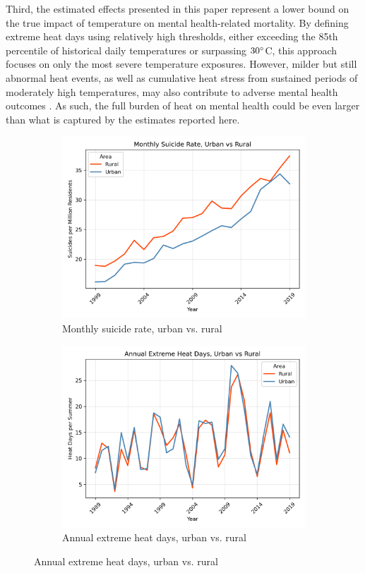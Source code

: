 \documentclass[12pt, a4paper]{article}
\begin{document}
Third, the estimated effects presented in this paper represent a lower bound on the true impact of temperature on mental health-related mortality. By defining extreme heat days using relatively high thresholds, either exceeding the 85th percentile of historical daily temperatures or surpassing $30\degree$C, this approach focuses on only the most severe temperature exposures. However, milder but still abnormal heat events, as well as cumulative heat stress from sustained periods of moderately high temperatures, may also contribute to adverse mental health outcomes \cite{HandHWHO}. As such, the full burden of heat on mental health could be even larger than what is captured by the estimates reported here.

\begin{figure}[H]
    \centering
    \begin{subfigure}[b]{0.48\textwidth}
        \includegraphics[width=\textwidth]{Monthly Suicide Rate.png}
        \caption{Monthly suicide rate, urban vs. rural}
        \label{fig:suicide}
    \end{subfigure}
    \hfill
    \begin{subfigure}[b]{0.48\textwidth}
        \includegraphics[width=\textwidth]{EHDs.png}
        \caption{Annual extreme heat days, urban vs. rural}
        \label{fig:ehds}
    \end{subfigure}
    

\end{figure}
\end{document}
